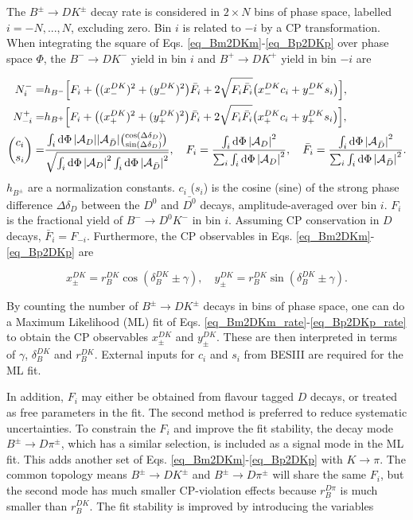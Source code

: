 \documentclass[12pt, a4paper, notitlepage, onecolumn]{article}
\numberwithin{equation}{section}
\begin{document}
The $B^\pm\to DK^\pm$ decay rate is considered in $2\times N$ bins of phase space, labelled $i = -N, ..., N$, excluding zero. Bin $i$ is related to $-i$ by a CP transformation. When integrating the square of Eqs. \eqref{eq_Bm2DKm}-\eqref{eq_Bp2DKp} over phase space $\Phi$, the $B^-\to DK^-$ yield in bin $i$ and $B^+\to DK^+$ yield in bin $-i$ are

\begin{align}
  N^-_i =& h_{B^-}\Big[F_i + \big((x_-^{DK})^2 + (y_-^{DK})^2\big)\bar{F}_i + 2\sqrt{F_i\bar{F}_i}\big(x_-^{DK}c_i + y_-^{DK}s_i\big)\Big], \label{eq_Bm2DKm_rate} \\
  N^+_{-i} =& h_{B^+}\Big[F_i + \big((x_+^{DK})^2 + (y_+^{DK})^2\big)\bar{F}_i + 2\sqrt{F_i\bar{F}_i}\big(x_+^{DK}c_i + y_+^{DK}s_i\big)\Big], \label{eq_Bp2DKp_rate} \\
  {c_i\choose s_i} =& \frac{\int_i\dd{\Phi}\abs{\mathcal{A}_D}\abs{\mathcal{A}_{\bar{D}}}{\cos(\Delta\delta_D)\choose\sin(\Delta\delta_D)}}{\sqrt{\int_i\dd{\Phi}\abs{\mathcal{A}_D}^2\int_i\dd{\Phi}\abs{\mathcal{A}_{\bar{D}}}^2}}, \quad F_i = \frac{\int_i\dd{\Phi}\abs{\mathcal{A}_D}^2}{\sum_i\int_i\dd{\Phi}\abs{\mathcal{A}_D}^2}, \quad \bar{F}_i = \frac{\int_i\dd{\Phi}\abs{\mathcal{A}_{\bar{D}}}^2}{\sum_i\int_i\dd{\Phi}\abs{\mathcal{A}_{\bar{D}}}^2}. \label{eq_hadronic_parameters}
\end{align}
$h_{B^\pm}$ are a normalization constants. $c_i$ ($s_i$) is the cosine (sine) of the strong phase difference $\Delta\delta_D$ between the $D^0$ and $\bar{D^0}$ decays, amplitude-averaged over bin $i$. $F_i$ is the fractional yield of $B^-\to D^0K^-$ in bin $i$. Assuming CP conservation in $D$ decays, $\bar{F}_i = F_{-i}$. Furthermore, the CP observables in Eqs. \eqref{eq_Bm2DKm}-\eqref{eq_Bp2DKp} are

\begin{equation}
  x_\pm^{DK} = r_B^{DK}\cos(\delta_B^{DK}\pm\gamma), \quad  y_\pm^{DK} = r_B^{DK}\sin(\delta_B^{DK}\pm\gamma).
  \label{eq_xy_cp}
\end{equation}

By counting the number of $B^\pm\to DK^\pm$ decays in bins of phase space, one can do a Maximum Likelihood (ML) fit of Eqs. \eqref{eq_Bm2DKm_rate}-\eqref{eq_Bp2DKp_rate} to obtain the CP observables $x_\pm^{DK}$ and $y_\pm^{DK}$. These are then interpreted in terms of $\gamma$, $\delta_B^{DK}$ and $r_B^{DK}$. External inputs for $c_i$ and $s_i$ from BESIII are required for the ML fit.

In addition, $F_i$ may either be obtained from flavour tagged $D$ decays, or treated as free parameters in the fit. The second method is preferred to reduce systematic uncertainties. To constrain the $F_i$ and improve the fit stability, the decay mode $B^\pm\to D\pi^\pm$, which has a similar selection, is included as a signal mode in the ML fit. This adds another set of Eqs. \eqref{eq_Bm2DKm}-\eqref{eq_Bp2DKp} with $K\to\pi$. The common topology means $B^\pm\to DK^\pm$ and $B^\pm\to D\pi^\pm$ will share the same $F_i$, but the second mode has much smaller CP-violation effects because $r_B^{D\pi}$ is much smaller than $r_B^{DK}$. The fit stability is improved by introducing the variables
\end{document}
